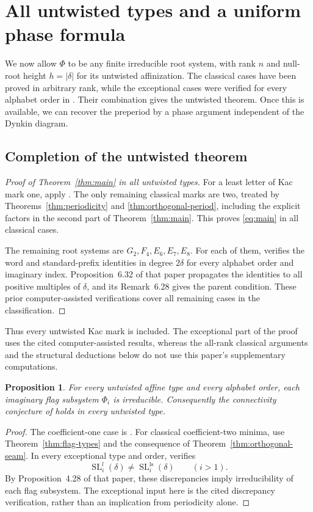 \documentclass[11pt]{amsart}
\numberwithin{equation}{section}
\newtheorem{proposition}[theorem]{Proposition}
\theoremstyle{definition}
\DeclareMathOperator{\SL}{SL}
\newcommand{\ls}{\mathrm{ls}}
\begin{document}
\section{All untwisted types and a uniform phase formula}\label{sec:all-untwisted}

We now allow $\Phi$ to be any finite irreducible root system, with rank $n$ and null-root height $h=|\delta|$ for its untwisted affinization. The classical cases have been proved in arbitrary rank, while the exceptional cases were verified for every alphabet order in \cite[Remark~6.29]{ET}. Their combination gives the untwisted theorem. Once this is available, we can recover the preperiod by a phase argument independent of the Dynkin diagram.

\subsection{Completion of the untwisted theorem}
\begin{proof}[Proof of Theorem~\ref{thm:main} in all untwisted types]
For a least letter of Kac mark one, apply \cite[Theorem~6.14]{ET}. The only remaining classical marks are two, treated by Theorems~\ref{thm:periodicity} and \ref{thm:orthogonal-period}, including the explicit factors in the second part of Theorem~\ref{thm:main}. This proves \eqref{eq:main} in all classical cases.

The remaining root systems are $G_2,F_4,E_6,E_7,E_8$. For each of them, \cite[Remark~6.29]{ET} verifies the word and standard-prefix identities in degree $2\delta$ for every alphabet order and imaginary index. Proposition~6.32 of that paper propagates the identities to all positive multiples of $\delta$, and its Remark~6.28 gives the parent condition. These prior computer-assisted verifications cover all remaining cases in the classification.
\end{proof}

Thus every untwisted Kac mark is included. The exceptional part of the proof uses the cited computer-assisted results, whereas the all-rank classical arguments and the structural deductions below do not use this paper's supplementary computations.

\begin{proposition}\label{prop:all-connectivity}
For every untwisted affine type and every alphabet order, each imaginary flag subsystem $\Phi_i$ is irreducible. Consequently the connectivity conjecture of \cite[Conjecture~4.27]{ETC} holds in every untwisted type.
\end{proposition}
\begin{proof}
The coefficient-one case is \cite[Lemma~4.31]{ETC}. For classical coefficient-two minima, use Theorem~\ref{thm:flag-types} and the consequence of Theorem~\ref{thm:orthogonal-seam}. In every exceptional type and order, \cite[Remark~4.30]{ETC} verifies
\[
 \SL_i^l(\delta)\ne\SL_i^{\ls}(\delta)\qquad(i>1).
\]
By Proposition~4.28 of that paper, these discrepancies imply irreducibility of each flag subsystem. The exceptional input here is the cited discrepancy verification, rather than an implication from periodicity alone.
\end{proof}
\end{document}
